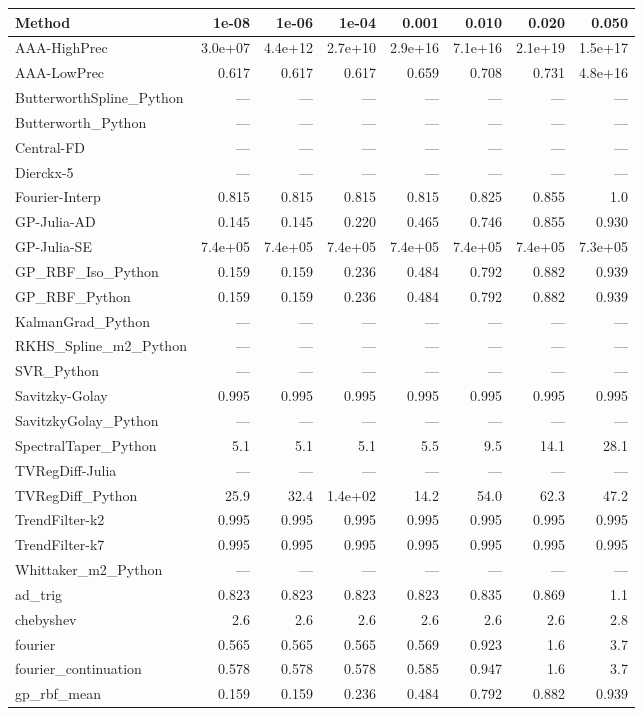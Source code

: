 \begin{longtable}{lrrrrrrr}
\toprule
\textbf{Method} & \textbf{1e-08} & \textbf{1e-06} & \textbf{1e-04} & \textbf{0.001} & \textbf{0.010} & \textbf{0.020} & \textbf{0.050} \\
\midrule
\endhead
AAA-HighPrec & 3.0e+07 & 4.4e+12 & 2.7e+10 & 2.9e+16 & 7.1e+16 & 2.1e+19 & 1.5e+17 \\
AAA-LowPrec & 0.617 & 0.617 & 0.617 & 0.659 & 0.708 & 0.731 & 4.8e+16 \\
ButterworthSpline\_Python & --- & --- & --- & --- & --- & --- & --- \\
Butterworth\_Python & --- & --- & --- & --- & --- & --- & --- \\
Central-FD & --- & --- & --- & --- & --- & --- & --- \\
Dierckx-5 & --- & --- & --- & --- & --- & --- & --- \\
Fourier-Interp & 0.815 & 0.815 & 0.815 & 0.815 & 0.825 & 0.855 & 1.0 \\
GP-Julia-AD & 0.145 & 0.145 & 0.220 & 0.465 & 0.746 & 0.855 & 0.930 \\
GP-Julia-SE & 7.4e+05 & 7.4e+05 & 7.4e+05 & 7.4e+05 & 7.4e+05 & 7.4e+05 & 7.3e+05 \\
GP\_RBF\_Iso\_Python & 0.159 & 0.159 & 0.236 & 0.484 & 0.792 & 0.882 & 0.939 \\
GP\_RBF\_Python & 0.159 & 0.159 & 0.236 & 0.484 & 0.792 & 0.882 & 0.939 \\
KalmanGrad\_Python & --- & --- & --- & --- & --- & --- & --- \\
RKHS\_Spline\_m2\_Python & --- & --- & --- & --- & --- & --- & --- \\
SVR\_Python & --- & --- & --- & --- & --- & --- & --- \\
Savitzky-Golay & 0.995 & 0.995 & 0.995 & 0.995 & 0.995 & 0.995 & 0.995 \\
SavitzkyGolay\_Python & --- & --- & --- & --- & --- & --- & --- \\
SpectralTaper\_Python & 5.1 & 5.1 & 5.1 & 5.5 & 9.5 & 14.1 & 28.1 \\
TVRegDiff-Julia & --- & --- & --- & --- & --- & --- & --- \\
TVRegDiff\_Python & 25.9 & 32.4 & 1.4e+02 & 14.2 & 54.0 & 62.3 & 47.2 \\
TrendFilter-k2 & 0.995 & 0.995 & 0.995 & 0.995 & 0.995 & 0.995 & 0.995 \\
TrendFilter-k7 & 0.995 & 0.995 & 0.995 & 0.995 & 0.995 & 0.995 & 0.995 \\
Whittaker\_m2\_Python & --- & --- & --- & --- & --- & --- & --- \\
ad\_trig & 0.823 & 0.823 & 0.823 & 0.823 & 0.835 & 0.869 & 1.1 \\
chebyshev & 2.6 & 2.6 & 2.6 & 2.6 & 2.6 & 2.6 & 2.8 \\
fourier & 0.565 & 0.565 & 0.565 & 0.569 & 0.923 & 1.6 & 3.7 \\
fourier\_continuation & 0.578 & 0.578 & 0.578 & 0.585 & 0.947 & 1.6 & 3.7 \\
gp\_rbf\_mean & 0.159 & 0.159 & 0.236 & 0.484 & 0.792 & 0.882 & 0.939 \\
\bottomrule
\end{longtable}


